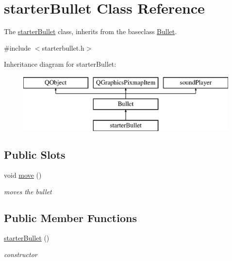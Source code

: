 \hypertarget{classstarterBullet}{}\section{starter\+Bullet Class Reference}
\label{classstarterBullet}


The \hyperlink{classstarterBullet}{starter\+Bullet} class, inherits from the baseclass \hyperlink{classBullet}{Bullet}.  




{\ttfamily \#include $<$starterbullet.\+h$>$}

Inheritance diagram for starter\+Bullet\+:\begin{figure}[H]
\begin{center}
\leavevmode
\includegraphics[height=3.000000cm]{classstarterBullet}
\end{center}
\end{figure}
\subsection*{Public Slots}
\begin{DoxyCompactItemize}
\item 
\mbox{\label{classstarterBullet_a24f547b4b243d174013d9b231a07e85c}} 
void \hyperlink{classstarterBullet_a24f547b4b243d174013d9b231a07e85c}{move} ()
\begin{DoxyCompactList}\small\item\em moves the bullet \end{DoxyCompactList}\end{DoxyCompactItemize}
\subsection*{Public Member Functions}
\begin{DoxyCompactItemize}
\item 
\mbox{\label{classstarterBullet_a62bf9e24bb38f03b4adea5590b1e0a87}} 
\hyperlink{classstarterBullet_a62bf9e24bb38f03b4adea5590b1e0a87}{starter\+Bullet} ()
\begin{DoxyCompactList}\small\item\em constructor \end{DoxyCompactList}\end{DoxyCompactItemize}


